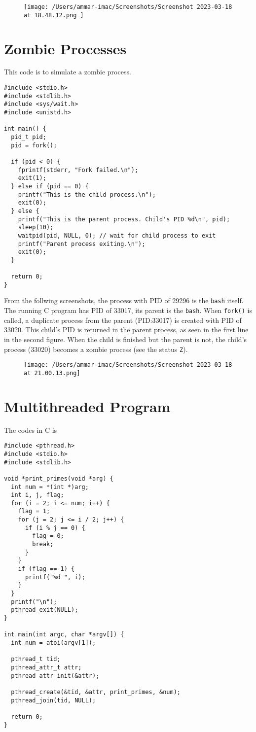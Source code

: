 \documentclass{article}
\def\c#1{\texttt{#1}}
\begin{document}
\begin{figure}[ht]
  \centering
  \texttt{[image: /Users/ammar-imac/Screenshots/Screenshot 2023-03-18 at 18.48.12.png ]}
\end{figure}

\section{Zombie Processes}%
This code is to simulate a zombie process.

\begin{verbatim}
#include <stdio.h>
#include <stdlib.h>
#include <sys/wait.h>
#include <unistd.h>

int main() {
  pid_t pid;
  pid = fork();

  if (pid < 0) {
    fprintf(stderr, "Fork failed.\n");
    exit(1);
  } else if (pid == 0) {
    printf("This is the child process.\n");
    exit(0);
  } else {
    printf("This is the parent process. Child's PID %d\n", pid);
    sleep(10);
    waitpid(pid, NULL, 0); // wait for child process to exit
    printf("Parent process exiting.\n");
    exit(0);
  }

  return 0;
}
\end{verbatim}


\newpage

From the follwing screenshots, the process with PID of 29296 is the \c{bash} itself.
The running C program has PID of 33017, its parent is the \c{bash}. When \c{fork()} is called,
a duplicate process from the parent (PID:33017) is created with PID of 33020. This child's PID is returned
in the parent process, as seen in the first line in the second figure. When the child is finished but
the parent is not, the child's process (33020) becomes a zombie process (see the status \c{Z}).

\begin{figure}[ht]
  \centering
  \texttt{[image: /Users/ammar-imac/Screenshots/Screenshot 2023-03-18 at 21.00.13.png]}
\end{figure}


\section{Multithreaded Program}%

The codes in C is
\begin{verbatim}
#include <pthread.h>
#include <stdio.h>
#include <stdlib.h>

void *print_primes(void *arg) {
  int num = *(int *)arg;
  int i, j, flag;
  for (i = 2; i <= num; i++) {
    flag = 1;
    for (j = 2; j <= i / 2; j++) {
      if (i % j == 0) {
        flag = 0;
        break;
      }
    }
    if (flag == 1) {
      printf("%d ", i);
    }
  }
  printf("\n");
  pthread_exit(NULL);
}

int main(int argc, char *argv[]) {
  int num = atoi(argv[1]);

  pthread_t tid;
  pthread_attr_t attr;
  pthread_attr_init(&attr);

  pthread_create(&tid, &attr, print_primes, &num);
  pthread_join(tid, NULL);

  return 0;
}
\end{verbatim}
\end{document}
